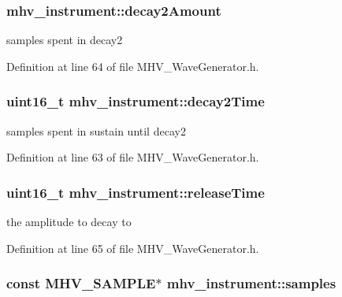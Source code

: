 \hypertarget{structmhv__instrument_a54b5eec4d485a7c096377290a2aa5456}{
\subsubsection[{decay2\-Amount}]{ {\bf mhv\-\_\-instrument\-::decay2\-Amount}}}
\label{structmhv__instrument_a54b5eec4d485a7c096377290a2aa5456}
samples spent in decay2 

\-Definition at line 64 of file \-M\-H\-V\-\_\-\-Wave\-Generator.\-h.

\hypertarget{structmhv__instrument_a68888a2d53929235d2e5379d46968325}{
\subsubsection[{decay2\-Time}]{\setlength{\rightskip}{0pt plus 5cm}uint16\-\_\-t {\bf mhv\-\_\-instrument\-::decay2\-Time}}}
\label{structmhv__instrument_a68888a2d53929235d2e5379d46968325}
samples spent in sustain until decay2 

\-Definition at line 63 of file \-M\-H\-V\-\_\-\-Wave\-Generator.\-h.

\hypertarget{structmhv__instrument_a376cf3d2ec80de657a1bc947f34eab55}{
\subsubsection[{release\-Time}]{\setlength{\rightskip}{0pt plus 5cm}uint16\-\_\-t {\bf mhv\-\_\-instrument\-::release\-Time}}}
\label{structmhv__instrument_a376cf3d2ec80de657a1bc947f34eab55}
the amplitude to decay to 

\-Definition at line 65 of file \-M\-H\-V\-\_\-\-Wave\-Generator.\-h.

\hypertarget{structmhv__instrument_a1a3dd705816f79c9f44da16743f38516}{
\subsubsection[{samples}]{\setlength{\rightskip}{0pt plus 5cm}const {\bf \-M\-H\-V\-\_\-\-S\-A\-M\-P\-L\-E}$\ast$ {\bf mhv\-\_\-instrument\-::samples}}}
\label{structmhv__instrument_a1a3dd705816f79c9f44da16743f38516}


